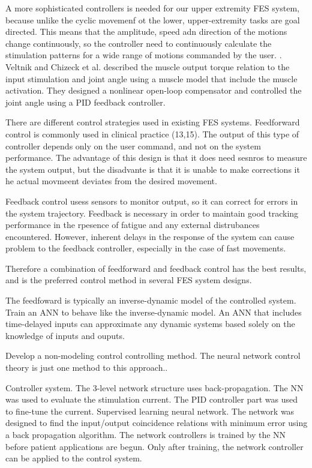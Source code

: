 A more sophisticated controllers is needed for our upper extremity FES system, because unlike the cyclic movemenf ot the lower, upper-extremity tasks are goal directed. This means that the amplitude, speed adn direction of the motions change continuously, so the controller need to continuously calculate the stimulation patterns for a wide range of motions commanded by the user. \cite{CFF}. 
Veltnik and Chizeck et al. described the muscle output torque relation to the input stimulation and joint angle using a muscle model that include the muscle activation. They designed a nonlinear open-loop compensator and controlled the joint angle using a PID feedback controller. \cite{NNPID}



There are different control strategies used in existing FES systems. Feedforward control is commonly used in clinical practice (13,15). The output of this type of controller depends only on the user command, and not on the system performance. The advantage of this design is that it does need sesnros to measure the system output, but the disadvante is that it is unable to make corrections it he actual movmeent deviates from the desired movement. \cite{CFF}

Feedback control usess sensors to monitor output, so it can correct for errors in the system trajectory. Feedback is necessary in order to maintain good tracking performance in the rpesence of fatigue and any external distrubances encountered. However, inherent delays in the response of the system can cause problem to the feedback controller, especially in the case of fast movements. \cite{CFF}

Therefore a combination of feedforward and feedback control has the best results, and is the preferred control method in several FES system designs. 

The feedfoward is typically an inverse-dynamic model of the controlled system. Train an ANN to behave like the inverse-dynamic model. An ANN that includes time-delayed inputs can approximate any dynamic systems based solely on the knowledge of inputs and ouputs.

Develop a non-modeling control controlling method. The neural network control theory is just one method to this approach.\cite{NNPID}.

Controller system. The 3-level network structure uses back-propagation. The NN was used to evaluate the stimulation current. The PID controller part was used to fine-tune the current. Supervised learning neural network. The network was designed to find the input/output coincidence relations with minimum error using a back propagation algorithm. The network controllers is trained by the NN before patient applications are begun. Only after training, the network controller can be applied to the control system. \cite{NNPID}


